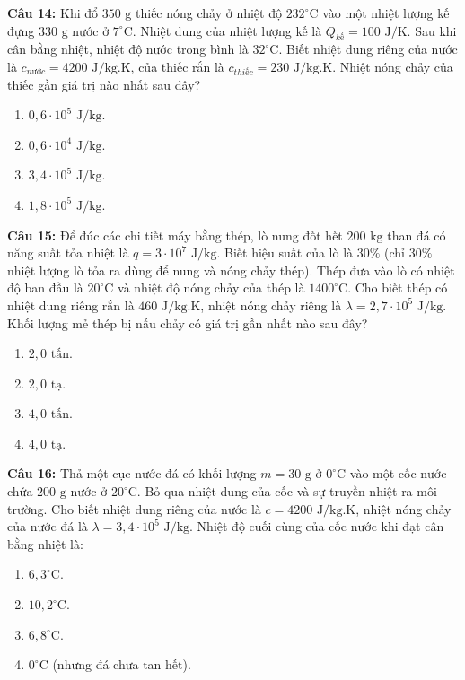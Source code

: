 \documentclass[12pt,a4paper]{article}
\begin{document}
\textbf{Câu 14:} Khi đổ $350\text{ g}$ thiếc nóng chảy ở nhiệt độ $232^{\circ}\text{C}$ vào một nhiệt lượng kế đựng $330\text{ g}$ nước ở $7^{\circ}\text{C}$. Nhiệt dung của nhiệt lượng kế là $Q_{kế} = 100\text{ J/K}$. Sau khi cân bằng nhiệt, nhiệt độ nước trong bình là $32^{\circ}\text{C}$. Biết nhiệt dung riêng của nước là $c_{nước} = 4200\text{ J/kg.K}$, của thiếc rắn là $c_{thiếc} = 230\text{ J/kg.K}$. Nhiệt nóng chảy của thiếc gần giá trị nào nhất sau đây?
\begin{enumerate}[label=\Alph*.]
  \item $0{,}6 \cdot 10^5\text{ J/kg}$.
  \item $0{,}6 \cdot 10^4\text{ J/kg}$.
  \item $3{,}4 \cdot 10^5\text{ J/kg}$.
  \item $1{,}8 \cdot 10^5\text{ J/kg}$.
\end{enumerate}

\textbf{Câu 15:} Để đúc các chi tiết máy bằng thép, lò nung đốt hết $200\text{ kg}$ than đá có năng suất tỏa nhiệt là $q = 3 \cdot 10^7\text{ J/kg}$. Biết hiệu suất của lò là $30\%$ (chỉ $30\%$ nhiệt lượng lò tỏa ra dùng để nung và nóng chảy thép). Thép đưa vào lò có nhiệt độ ban đầu là $20^{\circ}\text{C}$ và nhiệt độ nóng chảy của thép là $1400^{\circ}\text{C}$. Cho biết thép có nhiệt dung riêng rắn là $460\text{ J/kg.K}$, nhiệt nóng chảy riêng là $\lambda = 2{,}7 \cdot 10^5\text{ J/kg}$. Khối lượng mẻ thép bị nấu chảy có giá trị gần nhất nào sau đây?
\begin{enumerate}[label=\Alph*.]
  \item $2{,}0\text{ tấn}$.
  \item $2{,}0\text{ tạ}$.
  \item $4{,}0\text{ tấn}$.
  \item $4{,}0\text{ tạ}$.
\end{enumerate}

\textbf{Câu 16:} Thả một cục nước đá có khối lượng $m = 30\text{ g}$ ở $0^{\circ}\text{C}$ vào một cốc nước chứa $200\text{ g}$ nước ở $20^{\circ}\text{C}$. Bỏ qua nhiệt dung của cốc và sự truyền nhiệt ra môi trường. Cho biết nhiệt dung riêng của nước là $c = 4200\text{ J/kg.K}$, nhiệt nóng chảy của nước đá là $\lambda = 3{,}4 \cdot 10^5\text{ J/kg}$. Nhiệt độ cuối cùng của cốc nước khi đạt cân bằng nhiệt là:
\begin{enumerate}[label=\Alph*.]
  \item $6{,}3^{\circ}\text{C}$.
  \item $10{,}2^{\circ}\text{C}$.
  \item $6{,}8^{\circ}\text{C}$.
  \item $0^{\circ}\text{C}$ (nhưng đá chưa tan hết).
\end{enumerate}
\end{document}
